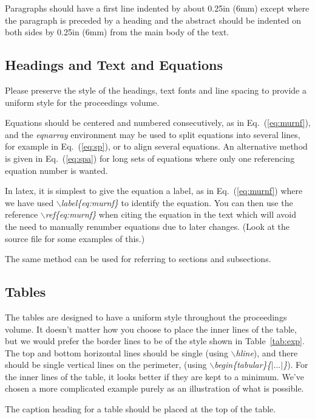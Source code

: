 Paragraphs should have a first line indented by about 0.25in (6mm)
except where the paragraph is preceded by a heading and the abstract
should be indented on both sides by 0.25in (6mm) from the main body of
the text.

\subsection{Headings and Text and Equations}
Please preserve the style of the headings, text fonts and line
spacing to provide a uniform style for the proceedings volume.

Equations should be centered and numbered consecutively, as in
Eq.~(\ref{eq:murnf}), and the {\em eqnarray} environment may be used
to split equations into several lines, for example in
Eq.~(\ref{eq:sp}), or to align several equations. An alternative
method is given in Eq.~(\ref{eq:spa}) for long sets of equations where
only one referencing equation number is wanted.

In latex, it is simplest to give the equation a label, as in
Eq.~(\ref{eq:murnf}) where we have used {\em
$\backslash$label\{eq:murnf\}} to identify the equation.  You can then
use the reference {\em $\backslash$ref\{eq:murnf\}} when citing the
equation in the text which will avoid the need to manually renumber
equations due to later changes. (Look at the source file for some
examples of this.)  

The same method can be used for referring to sections and subsections.

\subsection{Tables}
The tables are designed to have a uniform style throughout the
proceedings volume. It doesn't matter how you choose to place the
inner lines of the table, but we would prefer the border lines to be
of the style shown in Table~\ref{tab:exp}.  The top and bottom
horizontal lines should be single (using {\em $\backslash$hline}), and
there should be single vertical lines on the perimeter, (using {\em
$\backslash$begin\{tabular\}\{$|...|$\}}).  For the inner lines of the
table, it looks better if they are kept to a minimum. We've chosen a
more complicated example purely as an illustration of what is
possible.

The caption heading for a table should be placed at the top of 
the table.

